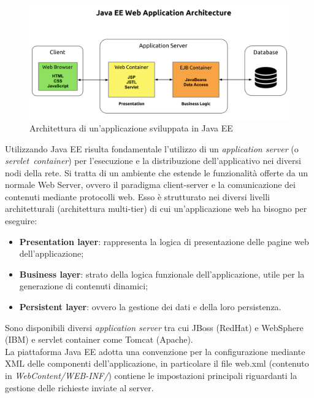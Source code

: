 	\begin{figure}[H]
		\centering
	   	\includegraphics[width=1\textwidth]{immagini/architettura_javaEE}
	   	\caption{Architettura di un'applicazione sviluppata in Java EE}
	\end{figure}
	
	Utilizzando Java EE risulta fondamentale l'utilizzo di un \textit{application server} (o \textit{servlet}\glossario\ \textit{container}) per l'esecuzione e la distribuzione dell'applicativo nei diversi nodi della rete.
	Si tratta di un ambiente che estende le funzionalità offerte da un normale Web Server, ovvero il paradigma client-server e la comunicazione dei contenuti mediante protocolli web. Esso è strutturato nei diversi livelli architetturali (architettura multi-tier) di cui un'applicazione web ha bisogno per eseguire:
	
	\begin{itemize}
		\item \textbf{Presentation layer}: rappresenta la logica di presentazione delle pagine web dell'applicazione;
		\item \textbf{Business layer}: strato della logica funzionale dell'applicazione, utile per la generazione di contenuti dinamici;
		\item \textbf{Persistent layer}: ovvero la gestione dei dati e della loro persistenza.
	\end{itemize}
	
	Sono disponibili diversi \textit{application server} tra cui JBoss (RedHat) e WebSphere (IBM) e servlet container come Tomcat (Apache).\\
	
	La piattaforma Java EE adotta una convenzione per la configurazione mediante XML delle componenti dell'applicazione, in particolare 
	il file web.xml (contenuto in \textit{WebContent/WEB-INF/}) contiene le impostazioni principali riguardanti la gestione delle richieste inviate al server.\\
	
